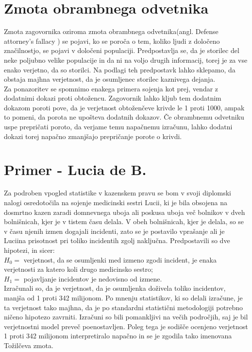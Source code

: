 \documentclass[12pt,a4paper]{amsart}
\theoremstyle{definition} %
\theoremstyle{plain} %
\begin{document}
\section{Zmota obrambnega odvetnika}
Zmota zagovornika oziroma zmota obrambnega odvetnika(angl. Defense attorney's fallacy ) se pojavi, ko se poroča o tem, koliko ljudi z 
določeno značilnostjo, se pojavi v določeni populaciji. Predpostavlja se, da je storilec del neke poljubno velike populacije in da ni na voljo 
drugih informacij, torej je za vse enako verjetno, da so storilci. Na podlagi teh predpostavk lahko sklepamo, da obstaja majhna verjetnost, 
da je osumljenec storilec kaznivega dejanja. \\

Za ponazoritev se spomnimo enakega primera sojenja kot prej, vendar z dodatnimi dokazi proti obtožencu. Zagovornik lahko kljub tem dodatnim 
dokazom poroti pove, da je verjetnost obtoženčeve krivde le 1 proti 1000, ampak to pomeni, da porota ne upošteva dodatnih dokazov. Če obrambnemu 
odvetniku uspe prepričati poroto, da verjame temu napačnemu izračunu, lahko dodatni dokazi torej napačno zmanjšajo prepričanje porote o krivdi. \vspace{3mm}

\section{Primer - Lucia de B.}
Za podroben vpogled statistike v kazenskem pravu se bom v svoji diplomski nalogi osredotočila na sojenje medicinski sestri Lucii, ki je bila
obsojena na dosmrtno kazen zaradi domnevnega uboja ali poskusa uboja več bolnikov v dveh bolnišnicah, kjer je v tistem času delala. V obeh
bolnišnicah, kjer je delala, so se v času njenih izmen dogajali incidenti, zato se je postavilo vprašanje ali je Luciina prisotnost pri
toliko incidentih zgolj naključna. Predpostavili so dve hipotezi, in sicer: \\
$H_0 =$ verjetnost, da se osumljenki med izmeno zgodi incident, je enaka verjetnosti za katero koli drugo medicinsko sestro; \\
$H_1=$ pojavljanje incidentov je nedovisno od izmene.\\
 
Izračunali so, da je verjetnost, da je osumljenka doživela toliko incidentov, manjša od 1 proti 342 milijonom. Po mnenju statistikov, ki so
delali izračune, je ta verjetnost tako majhna, da je po standardni statistični metodologiji potrebno ničeno hipotezo zavrniti. Izračuni so bili
pomankljivi na večih področjih, saj je bil verjetnostni model preveč poenostavljen. Poleg tega je sodišče ocenjeno verjetnost 1 proti 342 milijonom
interpretiralo napačno in se je zgodila tako imenovana Tožilčeva zmota.
\end{document}
